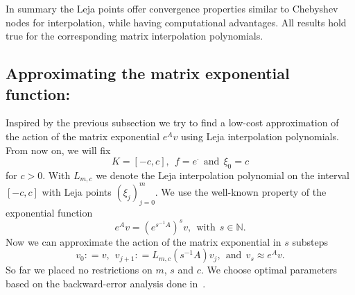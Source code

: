 \documentclass{scrartcl}
\newcommand{\defneq}{\mathrel{\mathop:}=}
\begin{document}
	In summary the Leja points offer convergence properties similar to Chebyshev nodes for interpolation, while having computational advantages. All results hold true for the corresponding matrix interpolation polynomials.
	
\subsection{Approximating the matrix exponential function:} \label{sec:ApproxMatrixExponential}
	Inspired by the previous subsection we try to find a low-cost approximation of the action of the matrix exponential $e^Av$ using Leja interpolation polynomials. From now on, we will fix 
	\[K=[-c,c], ~~ f = e^\cdot  ~~\text{and}~~ \xi_0 = c \]
	for $c>0$. With $L_{m,c}$ we denote the Leja interpolation polynomial on the interval $[-c,c]$ with Leja points $(\xi_j)_{j=0}^{m}$. We use the well-known property of the exponential function
	\[e^Av = (e^{s^{-1}A})^sv, ~~\text{with}~~ s\in\mathbb{N}.\]
	Now we can approximate the action of the matrix exponential in $s$ substeps
	\[v_0\defneq v, ~~ v_{j+1}\defneq L_{m,c}(s^{-1}A)v_j, ~~\text{and}~~ v_s \approx e^Av.\]
	So far we placed no restrictions on $m$, $s$ and $c$. We choose optimal parameters based on the backward-error analysis done in~\cite{lejarev}.
	
\end{document}
